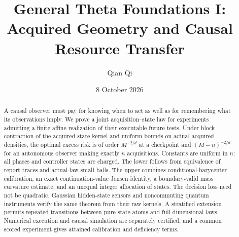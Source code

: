 \documentclass[11pt]{amsart}
\title{General Theta Foundations I:\\Acquired Geometry and Causal Resource Transfer}
\author{Qian Qi}\date{8 October 2026}
\theoremstyle{definition}\newtheorem{definition}[theorem]{Definition}
\theoremstyle{remark}\newtheorem{remark}[theorem]{Remark}
\begin{document}
\begin{abstract}
A causal observer must pay for knowing when to act as well as for remembering what its observations imply. We prove a joint acquisition--state law for experiments admitting a finite affine realization of their executable future tests. Under block contraction of the acquired-state kernel and uniform bounds on actual acquired densities, the optimal excess risk is of order $M^{-2/d}$ at a checkpoint and $(M-n)^{-2/d}$ for an autonomous observer making exactly $n$ acquisitions. Constants are uniform in $n$; all phases and controller states are charged. The lower follows from equivalence of report traces and actual-law small balls. The upper combines conditional-barycenter calibration, an exact continuation-value Jensen identity, a boundary-valid mass--curvature estimate, and an unequal integer allocation of states. The decision loss need not be quadratic. Gaussian hidden-state sensors and noncommuting quantum instruments verify the same theorem from their raw kernels. A stratified extension permits repeated transitions between pure-state atoms and full-dimensional laws. Numerical execution and causal simulation are separately certified, and a common scored experiment gives attained calibration and deficiency terms.
\end{abstract}
\maketitle







\appendix


\end{document}
